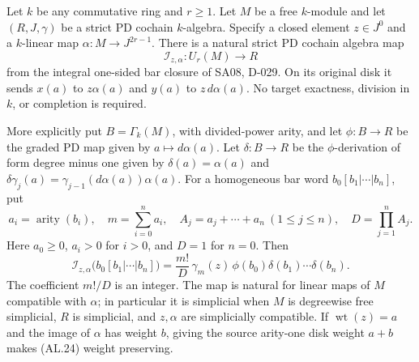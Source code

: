 \begin{theorem}
\label{AL05}
Let $k$ be any commutative ring and $r\geq1$.  Let $M$ be a
free $k$-module and let $(R,J,\gamma)$ be a strict PD
cochain $k$-algebra.  Specify a closed element
$z\in J^0$ and a $k$-linear map
$\alpha:M\to J^{2r-1}$.  There is a natural strict PD
cochain algebra map
\[
 \mathcal I_{z,\alpha}:U_r(M)\longrightarrow R
 \tag{AL.24}
\]
from the integral one-sided bar closure of SA08, D-029.
On its original disk it sends $x(a)$ to $z\alpha(a)$ and
$y(a)$ to $z\,d\alpha(a)$.
No target exactness, division in $k$, or completion is required.

More explicitly put $B=\Gamma_k(M)$, with divided-power arity,
and let $\phi:B\to R$ be the graded PD map given by
$a\mapsto d\alpha(a)$.  Let $\delta:B\to R$ be the
$\phi$-derivation of form degree minus one given by
$\delta(a)=\alpha(a)$ and
$\delta\gamma_j(a)=\gamma_{j-1}(d\alpha(a))\alpha(a)$.
For a homogeneous bar word
$b_0[b_1|\cdots|b_n]$, put
\[
 a_i=\operatorname{arity}(b_i),\quad
 m=\sum_{i=0}^n a_i,\quad
 A_j=a_j+\cdots+a_n\ (1\leq j\leq n),\quad
 D=\prod_{j=1}^n A_j .
\]
Here $a_0\geq0$, $a_i>0$ for $i>0$, and $D=1$ for $n=0$.
Then
\[
 \mathcal I_{z,\alpha}\bigl(b_0[b_1|\cdots|b_n]\bigr)
  =\frac{m!}{D}\,\gamma_m(z)\,
       \phi(b_0)\delta(b_1)\cdots\delta(b_n).
 \tag{AL.25}
\]
The coefficient $m!/D$ is an integer.
The map is natural for linear maps of $M$ compatible with
$\alpha$; in particular it is simplicial when $M$ is
degreewise free simplicial, $R$ is simplicial, and $z,\alpha$
are simplicially compatible.
If $\operatorname{wt}(z)=a$ and the image of $\alpha$ has
weight $b$, giving the source arity-one disk weight $a+b$
makes \textup{(AL.24)} weight preserving.
\end{theorem}

